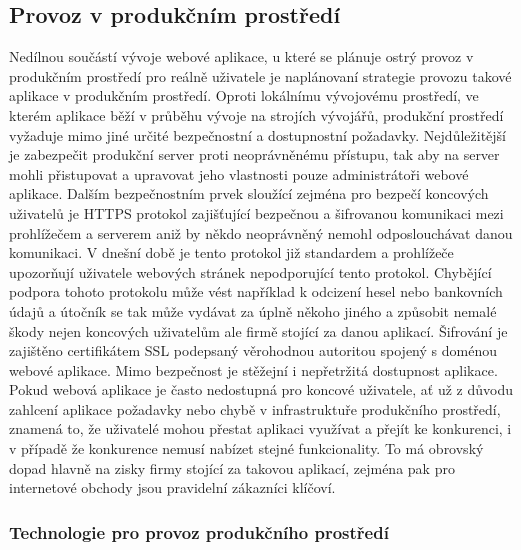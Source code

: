 	\subsection{Provoz v produkčním prostředí}

	Nedílnou součástí vývoje webové aplikace, u které se plánuje ostrý provoz v produkčním prostředí pro reálně uživatele
	je naplánovaní strategie provozu takové aplikace v produkčním prostředí.
	Oproti lokálnímu vývojovému prostředí, ve kterém aplikace běží v průběhu vývoje na strojích vývojářů, produkční
	prostředí vyžaduje mimo jiné určité bezpečnostní a dostupnostní požadavky.
	Nejdůležitější je zabezpečit produkční server proti neoprávněnému přístupu, tak aby na server mohli přistupovat a
	upravovat jeho vlastnosti pouze administrátoři webové aplikace.
	Dalším bezpečnostním prvek sloužící zejména pro bezpečí koncových uživatelů je HTTPS protokol zajišťující bezpečnou
	a šifrovanou komunikaci mezi prohlížečem a serverem aniž by někdo neoprávněný nemohl odposlouchávat danou komunikaci.
	V dnešní době je tento protokol již standardem a prohlížeče upozorňují uživatele webových stránek nepodporující tento
	protokol.
	Chybějící podpora tohoto protokolu může vést například k odcizení hesel nebo bankovních údajů a útočník se tak
	může vydávat za úplně někoho jiného a způsobit nemalé škody nejen koncových uživatelům ale firmě stojící za danou
	aplikací.
	Šifrování je zajištěno certifikátem SSL podepsaný věrohodnou autoritou spojený s doménou webové aplikace.
	Mimo bezpečnost je stěžejní i nepřetržitá dostupnost aplikace.
	Pokud webová aplikace je často nedostupná pro koncové uživatele, ať už z důvodu zahlcení aplikace požadavky nebo
	chybě v infrastruktuře produkčního prostředí, znamená to, že uživatelé mohou přestat aplikaci využívat a přejít
	ke konkurenci, i v případě že konkurence nemusí nabízet stejné funkcionality.
	To má obrovský dopad hlavně na zisky firmy stojící za takovou aplikací, zejména pak pro internetové obchody jsou
	pravidelní zákazníci klíčoví.

		\subsubsection{Technologie pro provoz produkčního prostředí}

